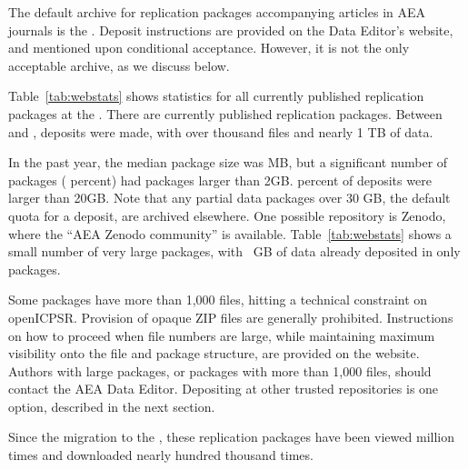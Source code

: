 The default archive for replication packages accompanying articles in AEA journals is the \aeadcr{}. Deposit instructions are provided on the Data Editor's website, and mentioned upon conditional acceptance. However, it is not the only acceptable archive, as we discuss below.


Table~\ref{tab:webstats} shows statistics for all currently published replication packages at the \aeadcr{}.  There are currently  
\icpsrtotalPublished{} published replication packages.  Between \firstday{} and \pkglastday{}, \pkgcount{} deposits were made, with over \pkgfilesT{} thousand files and nearly 1 TB of data. 

In the past year, the median package size was  \pkgsizemedian{} MB, but a significant number of packages (\pkgsizetwog{} percent) had  packages larger than 2GB. \pkgsizetwentyg{} percent of deposits were larger than 20GB. Note that any partial data packages over 30 GB, the default quota for a deposit, are archived elsewhere. One possible repository is Zenodo, where the  ``AEA Zenodo community'' is available. Table~\ref{tab:webstats} shows a small number of very large packages, with \zenodototalSizeGB{}~GB of data already deposited in only \zenodototalPublished{} packages. 

Some packages have more than 1,000 files, hitting a technical constraint on openICPSR. Provision of opaque ZIP files are generally prohibited. Instructions on how to proceed when file numbers are large, while maintaining maximum visibility onto the file and package structure, are provided on the website. Authors with large packages, or packages with more than 1,000 files, should contact the AEA Data Editor. Depositing at other trusted repositories is one option, described in the next section.

Since the migration to the \aeadcr{}, these replication packages have been viewed \icpsrtotalViewsM{} million times and downloaded nearly \icpsrtotalDownloadsHT{} hundred thousand times.




%
%
%



